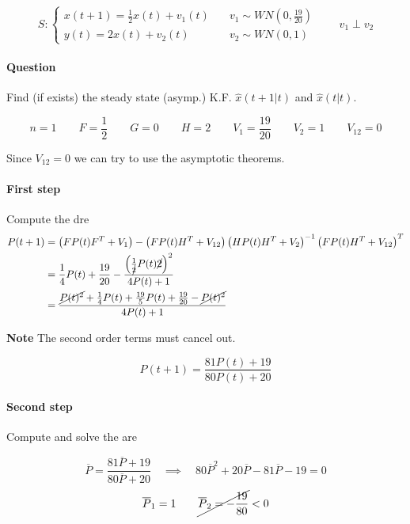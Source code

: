 


\begin{example}
    \[
        S: \begin{cases}
            x(t+1) = \frac{1}{2}x(t) + v_1(t) \quad& v_1 \sim WN(0, \frac{19}{20}) \\
            y(t) = 2x(t) + v_2(t) \quad& v_2 \sim WN(0, 1)
        \end{cases}
        \qquad
        v_1 \perp v_2
    \]

    \paragraph{Question} Find (if exists) the steady state (asymp.) K.F. $\hat{x}(t+1|t)$ and $\hat{x}(t|t)$.

    \[
        n = 1 \qquad F = \frac{1}{2} \qquad G = 0 \qquad H = 2 \qquad V_1 = \frac{19}{20} \qquad V_2 = 1 \qquad V_{12} = 0
    \]

    Since $V_{12} = 0$ we can try to use the asymptotic theorems.

    \paragraph{First step} Compute the \gls{dre}
    \begin{align*}
        P(t+1) &= \left( FP(t)F^T+V_1 \right) - \left( FP(t)H^T+V_{12} \right) \left( HP(t)H^T+V_2 \right)^{-1}\left( FP(t)H^T+V_{12} \right)^T \\
        &= \frac{1}{4}P(t) + \frac{19}{20} - \frac{ \left(\frac{1}{\cancel{2}}P(t)\cancel{2}\right)^2 }{4P(t)+1} \\
        &= \frac{\cancel{P(t)^2} + \frac{1}{4}P(t) + \frac{19}{5} P(t) + \frac{19}{20} - \cancel{P(t)^2} }{4P(t) + 1}
    \end{align*}

    \textbf{Note} The second order terms must cancel out.

    \[
        P(t+1) = \frac{81P(t) + 19}{80P(t)+20}
    \]

    \paragraph{Second step} Compute and solve the \gls{are}

    \[
        \overline{P} = \frac{81\overline{P} + 19}{80\overline{P}+20} \quad \implies \quad 80\overline{P}^2 + 20\overline{P}-81\overline{P}-19 = 0
    \]
    \[
        \overline{P}_1 = 1 \qquad \cancel{\overline{P}_2 = -\frac{19}{80}} < 0
    \]



\end{example}
